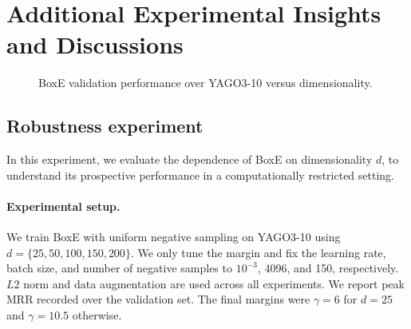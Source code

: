 \documentclass{article}
\begin{document}
\section{Additional Experimental Insights and Discussions}
\label{app:expInsight}

\begin{wrapfigure}[12]{r}{0.4\textwidth}
\centering
\vspace{-0.48cm}
\caption{BoxE validation performance over YAGO3-10 versus dimensionality.} \label{fig:robustness}
\end{wrapfigure}

\subsection{Robustness experiment}
\label{app:robustness}
In this experiment, we evaluate the dependence of BoxE on dimensionality $d$, to understand its prospective performance in a computationally restricted setting. 

\paragraph{Experimental setup.} We train BoxE with uniform negative sampling on YAGO3-10 using $d=\{25,50,100,150,200\}$. We only tune the margin and fix the learning rate, batch size, and number of negative samples to $10^{-3}$, 4096, and 150, respectively. $L2$ norm and data augmentation are used across all experiments. We report peak MRR recorded over the validation set. The final margins were $\gamma=6$ for $d=25$ and $\gamma=10.5$ otherwise.
\end{document}
